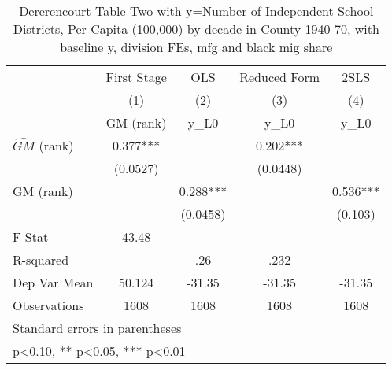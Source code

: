 \begin{table}[htbp]\centering
\def\sym#1{\ifmmode^{#1}\else\(^{#1}\)\fi}
\caption{Dererencourt Table Two with y=Number of Independent School Districts, Per Capita (100,000) by decade in County 1940-70, with baseline y, division FEs, mfg and black mig share}
\begin{tabular}{l*{4}{c}}
\toprule
                    & First Stage   &         OLS   &Reduced Form   &        2SLS   \\
                    &\multicolumn{1}{c}{(1)}&\multicolumn{1}{c}{(2)}&\multicolumn{1}{c}{(3)}&\multicolumn{1}{c}{(4)}\\
                    &\multicolumn{1}{c}{GM  (rank)}&\multicolumn{1}{c}{y\_L0}&\multicolumn{1}{c}{y\_L0}&\multicolumn{1}{c}{y\_L0}\\
\midrule
$\hat{GM}$ (rank)   &       0.377***&               &       0.202***&               \\
                    &    (0.0527)   &               &    (0.0448)   &               \\
\addlinespace
GM  (rank)          &               &       0.288***&               &       0.536***\\
                    &               &    (0.0458)   &               &     (0.103)   \\
\midrule
F-Stat              &       43.48   &               &               &               \\
R-squared           &               &         .26   &        .232   &               \\
Dep Var Mean        &      50.124   &      -31.35   &      -31.35   &      -31.35   \\
Observations        &        1608   &        1608   &        1608   &        1608   \\
\bottomrule
\multicolumn{5}{l}{\footnotesize Standard errors in parentheses}\\
\multicolumn{5}{l}{\footnotesize * p<0.10, ** p<0.05, *** p<0.01}\\
\end{tabular}
\end{table}
